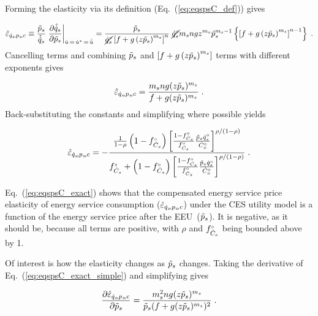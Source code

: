 \documentclass[12pt]{article}\usepackage[]{graphicx}\usepackage[]{xcolor}
\begin{document}
Forming the elasticity via its definition (Eq.~(\ref{eq:eqspsC_def})) gives

\begin{equation}
  \eqspsChat \equiv \frac{\amacro{p}_s}{\rasub{q}_s} \eval{\pdv{\rasub{q}_s}{\amacro{p}_s}}_{\rate{u} \, = \, \rbsub{u} \, = \, \rasub{u}} 
         = \frac{\amacro{p}_s}{\cancel{\rorig{q}_s} \left[ f + g \left( z \amacro{p}_s \right)^{m_s} \right]^n } \;
           \cancel{\rorig{q}_s} m_s n g z^{m_s} \amacro{p}_s^{m_s - 1} 
                \left\{ \left[ f + g \left( z \amacro{p}_s \right)^{m_s} \right]^{n-1} \right\} \; .
\end{equation}
%
Cancelling terms and
combining $\tilde{p}_s$ and $\left[ f + g \left( z \tilde{p}_s \right)^{m_s} \right]$ 
terms with different exponents gives

\begin{equation} \label{eq:eqspsC_exact_simple}
  \hat{\varepsilon}_{\dot{q}_s\!,p_s\!,c} = \frac{m_s n g (z \tilde{p}_s)^{m_s}}{f + g(z \tilde{p}_s)^{m_s}} \; .
\end{equation}
%
Back-substituting the constants and simplifying where possible yields

\begin{equation} \label{eq:eqspsC_exact}
  \hat{\varepsilon}_{\dot{q}_s\!,p_s\!,c} = - \frac{\frac{1}{1 - \rho} \left( 1 - {}{f}^{\scriptscriptstyle \circ}_{\dot{C}_s} \right) \left[ \frac{1 - {}{f}^{\scriptscriptstyle \circ}_{\dot{C}_s}}{{}{f}^{\scriptscriptstyle \circ}_{\dot{C}_s}} \frac{\tilde{p}_s {}{\dot{q}}^{\scriptscriptstyle \circ}_s}{{}{\dot{C}}^{\scriptscriptstyle \circ}_o} \right] ^ {\rho / (1 - \rho)} }{{}{f}^{\scriptscriptstyle \circ}_{\dot{C}_s} + \left( 1 - {}{f}^{\scriptscriptstyle \circ}_{\dot{C}_s} \right) \left[ \frac{1 - {}{f}^{\scriptscriptstyle \circ}_{\dot{C}_s}}{{}{f}^{\scriptscriptstyle \circ}_{\dot{C}_s}} \frac{\tilde{p}_s {}{\dot{q}}^{\scriptscriptstyle \circ}_s}{{}{\dot{C}}^{\scriptscriptstyle \circ}_o} \right] ^ {\rho / (1 - \rho)} } \; .
\end{equation}

Eq.~(\ref{eq:eqspsC_exact}) shows that the compensated 
energy service price elasticity of energy service consumption ($\hat{\varepsilon}_{\dot{q}_s\!,p_s\!,c}$)
under the CES utility model is a function 
of the energy service price after the EEU~($\tilde{p}_s$). It is negative,
as it should be, because all terms are positive, with $\rho$ and ${}{f}^{\scriptscriptstyle \circ}_{\dot{C}_s}$ being bounded above by 1.

Of interest is how the elasticity changes as $\tilde{p}_s$ changes. Taking
the derivative of Eq.~(\ref{eq:eqspsC_exact_simple}) and simplifying gives

\begin{equation} \label{eq:eqspsC_exact_d}
 \pdv{\hat{\varepsilon}_{\dot{q}_s\!,p_s\!,c}}{\tilde{p}_s} = \frac{m_s^2 n g (z \tilde{p}_s)^{m_s}}{\tilde{p}_s(f + g(z \tilde{p}_s)^{m_s})^2} \; .
\end{equation}
\end{document}
